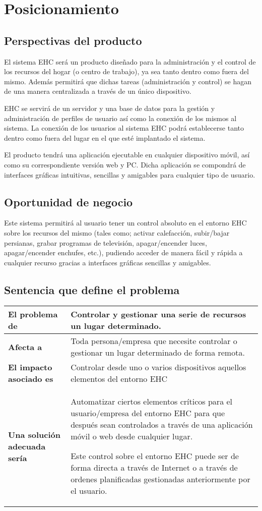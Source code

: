 \chapter{Posicionamiento}

\section{Perspectivas del producto}
    El sistema EHC será un producto dise\~nado para la administración y el control de los recursos del hogar (o centro de trabajo), ya sea tanto dentro como fuera del mismo. Además permitirá que dichas tareas (administración y control) se hagan de una manera centralizada a trav\'es de un único dispositivo.

    EHC se servirá de un servidor y una base de datos para la gestión y administración de perfiles de usuario así como la conexión de los mismos al sistema. La conexión de los usuarios al sistema EHC podrá establecerse tanto dentro como fuera del lugar en el que est\'e implantado el sistema.

    El producto tendrá una aplicación ejecutable en cualquier dispositivo móvil, así como su correspondiente versión web y PC. Dicha aplicación se compondrá de interfaces gráficas intuitivas, sencillas y amigables para cualquier tipo de usuario.

\section{Oportunidad de negocio}
    Este sistema permitirá al usuario tener un control absoluto en el entorno EHC sobre los recursos del mismo (tales como; activar calefacción, subir/bajar persianas, grabar programas de televisión, apagar/encender luces, apagar/encender enchufes, etc.), pudiendo acceder de manera fácil y rápida a cualquier recurso gracias a interfaces gráficas sencillas y amigables.

\section{Sentencia que define el problema}
    \begin{tabular}{|p{6cm}|p{10cm}|}
        \hline \textbf{El problema de} & Controlar y gestionar una serie de recursos un lugar determinado.\\
        \hline \textbf{Afecta a} & Toda persona/empresa que necesite controlar o gestionar un lugar determinado de forma remota.\\
        \hline \textbf{El impacto asociado es} & Controlar desde uno o varios dispositivos aquellos elementos del entorno EHC \\
        \hline \textbf{Una solución adecuada sería} & Automatizar ciertos elementos críticos para el usuario/empresa del entorno EHC para que después sean controlados a través de una aplicación móvil o web desde cualquier lugar. \par
        Este control sobre el entorno EHC puede ser de forma directa a través de Internet o a través de ordenes planificadas gestionadas anteriormente por el usuario.\\
        \hline
    \end{tabular}

